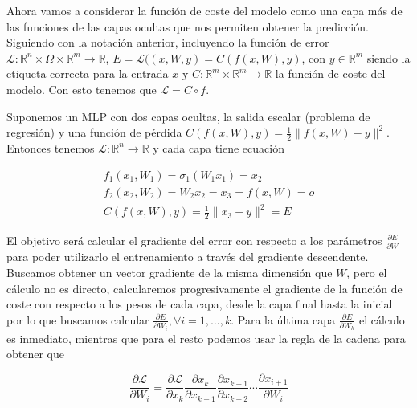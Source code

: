 Ahora vamos a considerar la función de coste del modelo como una capa más de las funciones de las capas ocultas que nos permiten obtener la predicción. Siguiendo con la notación anterior, incluyendo la función de error $\mathcal{L}: \mathbb{R}^n \times \Omega \times \mathbb{R}^m \rightarrow \mathbb{R}$, $E=\mathcal{L}((x,W,y)= C(f(x,W),y)$, con $y \in \mathbb{R}^m$ siendo la etiqueta correcta para la entrada $x$ y $C: \mathbb{R}^m \times \mathbb{R}^m \rightarrow \mathbb{R}$ la función de coste del modelo. Con esto tenemos que $\mathcal{L} = C \circ f$. 


\begin{ejemplo}
    Suponemos un MLP con dos capas ocultas, la salida escalar (problema de regresión) y una función de pérdida $C(f(x,W),y)=\frac{1}{2} \| f(x,W) - y\|^2$. Entonces tenemos $\mathcal{L}:\mathbb{R}^n \rightarrow \mathbb{R}$ y cada capa tiene ecuación

    
    
    \begin{gather*}
    f_1(x_1, W_1)=\sigma_1(W_1x_1)=x_2 \\
      f_2(x_2, W_2)=W_2x_2=x_3=f(x,W)=o  \\
      C(f(x,W),y)= \frac{1}{2} \| x_3 - y \|^2 = E
    \end{gather*}

    


\end{ejemplo}

El objetivo será calcular el gradiente del error con respecto a los parámetros $\frac{\partial E}{\partial W}$  para poder utilizarlo el entrenamiento a través del gradiente descendente. Buscamos obtener un vector gradiente de la misma dimensión que $W$, pero el cálculo no es directo, calcularemos progresivamente el gradiente de la función de coste con respecto a los pesos de cada capa, desde la capa final hasta la inicial por lo que buscamos calcular $\frac{\partial E}{\partial W_i}, \forall i=1,\ldots,k$.  Para la última capa $\frac{\partial E}{\partial W_k}$ el cálculo es inmediato, mientras que para el resto podemos usar la regla de la cadena para obtener que 

$$\frac{\partial \mathcal{L}}{\partial W_i}=\frac{\partial \mathcal{L}}{\partial x_k} \frac{\partial x_k}{\partial x_{k-1}} \frac{\partial x_{k-1}}{\partial x_{k-2}} \cdots \frac{\partial x_{i+1}}{\partial W_i}$$

